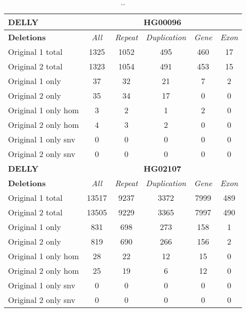 \begin{table}[htb]
\begin{center}
\begin{tabular}{|l|c||c|c|c|c|}
\hline
{\bf DELLY} & \multicolumn{5}{|c|}{\bf HG00096} \\
\hline
\cline{2-6}
{\bf Deletions} & {\it All} & {\it Repeat} & {\it Duplication} & {\it Gene} & {\it Exon} \\
\hline
Original 1 total & 1325 & 1052 & 495 & 460 & 17\\ 
\hline
Original 2 total & 1323 & 1054 & 491 & 453 & 15\\ 
\hline
Original 1 only & 37 & 32 & 21 & 7 & 2\\ 
\hline
Original 2 only & 35 & 34 & 17 & 0 & 0\\ 
\hline
Original 1 only hom & 3 & 2 & 1 & 2 & 0\\ 
\hline
Original 2 only hom & 4 & 3 & 2 & 0 & 0\\ 
\hline
Original 1 only snv & 0 & 0 & 0 & 0 & 0\\ 
\hline
Original 2 only snv & 0 & 0 & 0 & 0 & 0\\ 
\hline
\hline
{\bf DELLY} & \multicolumn{5}{|c|}{\bf HG02107} \\
\hline
\cline{2-6}
{\bf Deletions} & {\it All} & {\it Repeat} & {\it Duplication} & {\it Gene} & {\it Exon} \\
\hline
Original 1 total & 13517 & 9237 & 3372 & 7999 & 489\\ 
\hline
Original 2 total & 13505 & 9229 & 3365 & 7997 & 490\\ 
\hline
Original 1 only & 831 & 698 & 273 & 158 & 1\\ 
\hline
Original 2 only & 819 & 690 & 266 & 156 & 2\\ 
\hline
Original 1 only hom & 28 & 22 & 12 & 15 & 0\\ 
\hline
Original 2 only hom & 25 & 19 & 6 & 12 & 0\\ 
\hline
Original 1 only snv & 0 & 0 & 0 & 0 & 0\\ 
\hline
Original 2 only snv & 0 & 0 & 0 & 0 & 0\\ 
\hline
\end{tabular}
\end{center}
\caption{ .. }
\label{tab:orig-vs-shuf-delly-deletions}
\end{table}

